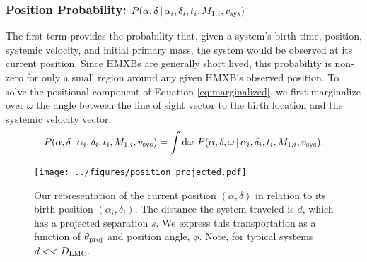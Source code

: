 \documentclass[12pt, preprint]{aastex}
\newcommand{\given}{\,|\,}
\newcommand{\dd}{\mathrm{d}}
\begin{document}
\subsubsection{Position Probability: $P( \alpha, \delta \given \alpha_i, \delta_i, t_i, M_{1,i}, v_{\rm sys} )$} \label{sec:ra_dec}

The first term provides the probability that, given a system's birth time, position, systemic velocity, and initial primary mass, the system would be observed at its current position. Since HMXBs are generally short lived, this probability is non-zero for only a small region around any given HMXB's observed position. To solve the positional component of Equation \ref{eq:marginalized}, we first marginalize over $\omega$ the angle between the line of sight vector to the birth location and the systemic velocity vector:
\begin{equation}
P(\alpha, \delta \given \alpha_i, \delta_i, t_i, M_{1,i}, v_{\rm sys} ) = \int \dd \omega\ P(\alpha, \delta, \omega \given \alpha_i, \delta_i, t_i, M_{1,i}, v_{\rm sys} ). \label{eq:P_pos_1}
\end{equation}

\begin{figure}[h!]
\begin{center}
\texttt{[image: ../figures/position\_projected.pdf]}
\caption{Our representation of the current position $(\alpha, \delta)$ in relation to its birth position $(\alpha_i, \delta_i)$. The distance the system traveled is $d$, which has a projected separation $s$. We express this transportation as a function of $\theta_{\rm proj}$ and position angle, $\phi$. Note, for typical systems $d << D_{\rm LMC}$.}
\label{fig:position_projection}
\end{center}
\end{figure}
\end{document}

